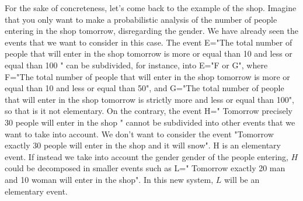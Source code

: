 \documentclass[reqno]{amsart}
\newcommand{\<}{{\langle \!\! \langle}}
\renewcommand{\>}{{\rangle \!\! \rangle}}
\begin{document}
For the sake of concreteness, let's come back to the example of the shop. Imagine that you only want to make a probabilistic analysis of  the number of people entering in the shop tomorrow, disregarding the gender. We have already seen the events that we want to consider in this case. The event E="The total number of people that will enter in the shop tomorrow is more or equal than 10 and less or equal than 100 " can be subdivided, for instance, into E="F or G", where 
F="The total number of people that will enter in the shop tomorrow is more or equal than 10 and less or equal than 50", and 
G="The total number of people that will enter in the shop tomorrow is strictly more and less or equal than 100", so that is it not elementary. On the contrary, the event H=" Tomorrow precisely 30 people will enter in the shop " cannot be subdivided into other events that we want to take into account. We don't want to consider the event "Tomorrow exactly 30 people will enter in the shop and it will snow". H is an elementary event. 
If instead we take into account the gender  gender of the people entering, $H$ could be decomposed in smaller events such as L=" Tomorrow exactly 20 man and 10 woman will enter in the shop". In this new system, $L$ will be an elementary event. \\ 
\end{document}
